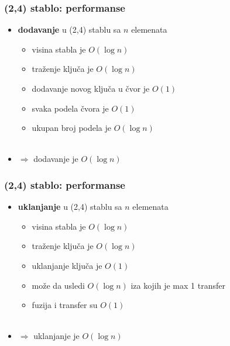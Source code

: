 \documentclass[compress,aspectratio=169]{beamer}
\begin{document}
\begin{frame}[fragile]
  \frametitle{(2,4) stablo: performanse}
  \begin{itemize}
    \item \textbf{dodavanje} u (2,4) stablu sa $n$ elemenata
    \begin{itemize}
      \item visina stabla je $O(\log n)$
      \item traženje ključa je $O(\log n)$
      \item dodavanje novog ključa u čvor je $O(1)$
      \item svaka podela čvora je $O(1)$
      \item ukupan broj podela je $O(\log n)$ \\ \ \\
    \end{itemize}
    \item $\Rightarrow$ dodavanje je $O(\log n)$ 
  \end{itemize}
\end{frame}

\begin{frame}[fragile]
  \frametitle{(2,4) stablo: performanse}
  \begin{itemize}
    \item \textbf{uklanjanje} u (2,4) stablu sa $n$ elemenata
    \begin{itemize}
      \item visina stabla je $O(\log n)$
      \item traženje ključa je $O(\log n)$
      \item uklanjanje ključa je $O(1)$
      \item može da usledi $O(\log n)$ iza kojih je max 1 transfer
      \item fuzija i transfer su $O(1)$ \\ \ \\
    \end{itemize}
    \item $\Rightarrow$ uklanjanje je $O(\log n)$ 
  \end{itemize}
\end{frame}
\end{document}
